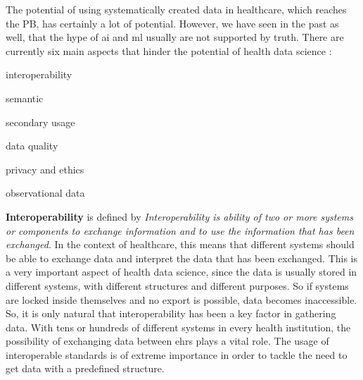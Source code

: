 The potential of using systematically created data in healthcare, which reaches the PB, has certainly a lot of potential. However, we have seen in the past as well, that the hype of \ac{ai} and \ac{ml} usually are not supported by truth. There are currently six main aspects that hinder the potential of health data science \cite{panchInconvenientTruthAI2019,peekThreeControversiesHealth2018}:
\begin{myitemize}
    \item interoperability
    \item semantic
    \item secondary usage
    \item data quality
    \item privacy and ethics
    \item observational data
\end{myitemize}

\textbf{Interoperability} is defined by \textit{Interoperability is ability of two or more systems or components to exchange information and to use the information that has been exchanged}\cite{182763}. In the context of healthcare, this means that different systems should be able to exchange data and interpret the data that has been exchanged. This is a very important aspect of health data science, since the data is usually stored in different systems, with different structures and different purposes. So if systems are locked inside themselves and no export is possible, data becomes inaccessible. So, it is only natural that interoperability has been a key factor in gathering data. With tens or hundreds of different systems in every health institution, the possibility of exchanging data between \acp{ehr} plays a vital role. The usage of interoperable standards is of extreme importance in order to tackle the need to get data with a predefined structure.


